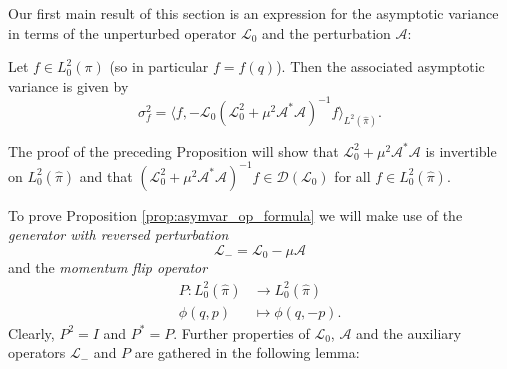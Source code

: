Our first main result of this section is an expression for the asymptotic
variance in terms of the unperturbed operator $\mathcal{L}_{0}$ and
the perturbation $\mathcal{A}$:
\begin{proposition}
	\label{prop:asymvar_op_formula}
	Let $f\in L_{0}^{2}(\pi)$  (so in particular $f=f(q)$).
	Then the associated asymptotic variance is given by 
	\begin{equation}
	\label{eq:asymvar_op_formula}
	\sigma_{f}^{2}=\langle f,-\mathcal{L}_{0}(\mathcal{L}_{0}^{2}+\mu^{2}\mathcal{A}^{*}\mathcal{A})^{-1}f\rangle_{L^{2}(\widehat{\pi})}.
	\end{equation}
	
\end{proposition}
\begin{remark}
The proof of the preceding Proposition will show that $\mathcal{L}_{0}^{2}+\mu^{2}\mathcal{A}^{*}\mathcal{A}$ is invertible on $L^2_0(\widehat{\pi})$ and that $(\mathcal{L}_{0}^{2}+\mu^{2}\mathcal{A}^{*}\mathcal{A})^{-1}f \in \mathcal{D}(\mathcal{L}_0)$ for all $f \in L^2_0(\widehat{\pi})$. 
\end{remark}
To prove Proposition \ref{prop:asymvar_op_formula} we will make use of the \emph{generator
	with reversed perturbation} 
\[
\mathcal{L}_{-}=\mathcal{L}_{0}-\mu\mathcal{A}
\]
and the \emph{momentum flip operator} 
\begin{align*}
P:L_{0}^{2}(\widehat{\pi}) & \rightarrow L_{0}^{2}(\widehat{\pi})\\
\phi(q,p) & \mapsto\phi(q,-p).
\end{align*}
Clearly, $P^{2}=I$ and $P^{*}=P$. Further properties of $\mathcal{L}_{0}$,
$\mathcal{A}$ and the auxiliary operators $\mathcal{L}_{-}$ and
$P$ are gathered in the following lemma:
